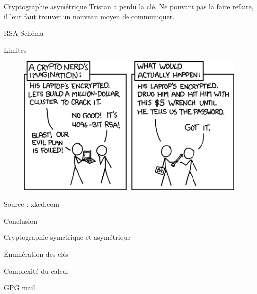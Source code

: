 \documentclass{beamer}
\begin{document}
\begin{frame}{Cryptographie asymétrique}
  Tristan a perdu la clé. Ne pouvant pas la faire refaire, il leur faut trouver un nouveau moyen de communiquer.
\end{frame}

\begin{frame}{RSA}
  Schéma
  \end{frame}

\begin{frame}{Limites}
  \begin{figure}
    \centering
    \includegraphics[scale = 0.5]{xkcdsecurity.png}
  \end{figure}
\footnotesize{Source : xkcd.com}
\end{frame}

\begin{frame}{Conclusion}
  \begin{center}
  Cryptographie symétrique et asymétrique

  Énumération des clés  

  Complexité du calcul
\end{center}

  
  GPG mail

  \end{frame}
\end{document}
